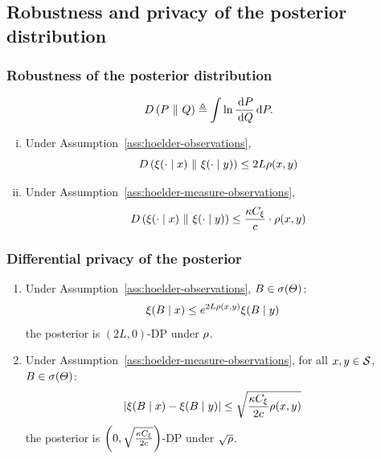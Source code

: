 \subsection{Robustness and privacy of the posterior distribution}
\label{sec:robustness}
\begin{frame}
  \frametitle{Robustness of the posterior distribution}
  \begin{definition}[KL divergence]
    \begin{equation}
      \label{eq:kl-divergence}
      D\left(P ~\middle\|~ Q\right) \mathrel{\triangleq} \int \ln \frac{\,\mathrm{d}{P}}{\,\mathrm{d}{Q}} \,\mathrm{d}{P}.
    \end{equation}
  \end{definition}
  \begin{theorem}
    \begin{enumerate}[(i)]
    \item<2-> Under Assumption~\ref{ass:hoelder-observations},
      \begin{equation}
        D\left(\xi(\cdot \mid x) ~\middle\|~ \xi(\cdot \mid y)\right)
        \leq
        2L\rho(x, y)
      \end{equation}
      \label{the:kl-1}
    \item<3-> Under Assumption~\ref{ass:hoelder-measure-observations},
      \begin{equation}
        D\left(\xi(\cdot \mid x) ~\middle\|~ \xi(\cdot \mid y)\right)
        \leq
        \frac{\kappa C_\xi }{c} \cdot 
        \rho(x, y)
      \end{equation}
      \label{the:kl-2}
    \end{enumerate}
    \label{the:kl}
  \end{theorem}
\end{frame}

\begin{frame}
  \frametitle{Differential privacy of the posterior}
  \begin{theorem}
    \begin{enumerate}
    \item<1-> Under Assumption~\ref{ass:hoelder-observations}, 
      $B \in \sigma(\Theta)$:
      \begin{align}
        \xi(B \mid x) & \leq e^{ 2L \rho(x, y)} \xi(B \mid y) 
      \end{align}
      \ie the posterior is $(2L, 0)$-DP under $\rho$.
      \label{thm:dp1}
    \item<2-> Under Assumption~\ref{ass:hoelder-measure-observations}, for
      all $x,y \in \mathcal{{\mathcal{S}}}$, $B \in \sigma(\Theta)$:
      \begin{align*}
        \left|\xi(B \mid x) - \xi(B \mid y)\right|
        & \leq \sqrt{\frac{\kappa C_\xi }{2c} \rho(x, y)}
      \end{align*}
      \ie the posterior is $\left(0,  \sqrt{\frac{\kappa C_\xi }{2c}}\right)$-DP under $\sqrt{\rho}$.
      \label{thm:dp2}
    \end{enumerate}
    \label{thm:dp}
  \end{theorem}
\end{frame}

